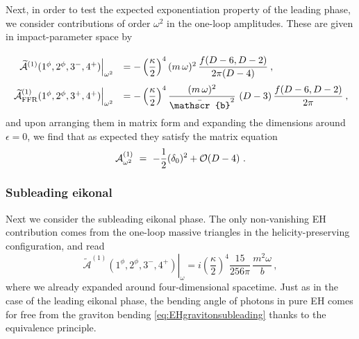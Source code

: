 \documentclass[a4paper,11pt]{article}
\numberwithin{equation}{section}
\newcommand{\cA}{\mathcal{A}}
\def\cA{\mathcal{A}}
\begin{document}
Next, in order to test the expected exponentiation property of the leading phase, we consider contributions of order $\omega^2$ in the one-loop amplitudes. These are given in impact-parameter space by
\begin{equation}
\def\arraystretch{2.5}
\begin{array}{rl}
 \left. \widetilde{\cA}^{(1)} (1^\phi,2^\phi,3^{-},4^{+})\right|_{\omega^2} &= - \left(\dfrac{\kappa}{2}\right)^4 (m\,\omega)^2 \, \dfrac{f(D-6,D-2)}{2\pi (D-4)} \> , \\
 \left. \widetilde{\cA}^{(1)}_{\rm FFR} (1^\phi,2^\phi,3^{+},4^{+})\right|_{\omega^2} &= - \left(\dfrac{\kappa}{2}\right)^4 \dfrac{(m\,\omega)^2}{\bar{\mathscr{b}}^2} \, \left(D-3\right) \dfrac{f(D-6,D-2)}{2 \pi} \>,
\end{array}
\end{equation}
and upon arranging them in matrix form and expanding the dimensions around $\epsilon=0$, we find that as expected they satisfy the matrix equation
\begin{equation}
    \mathcal{A}^{(1)}_{\omega^2} \ = \ - {1\over 2} (\mathcal{\delta}_0)^2 + \mathcal{O}(D-4)\ .
\end{equation}
%

\subsubsection{Subleading eikonal}

Next we consider the subleading eikonal phase. The only non-vanishing EH contribution comes from the one-loop massive triangles in the helicity-preserving configuration, and read
\begin{equation}
    \left. \widetilde{\cA}^{(1)} (1^\phi,2^\phi,3^{-},4^{+})\right|_{\omega} = i \left(\frac{\kappa}{2}\right)^4\frac{15}{256\pi} \, \frac{m^2 \omega}{b} \, , 
\end{equation}
where we already expanded around four-dimensional spacetime. Just as in the case of the leading eikonal phase, the bending angle of photons in pure EH comes for free from the graviton bending \eqref{eq:EHgravitonsubleading} thanks to the equivalence principle.
\end{document}
